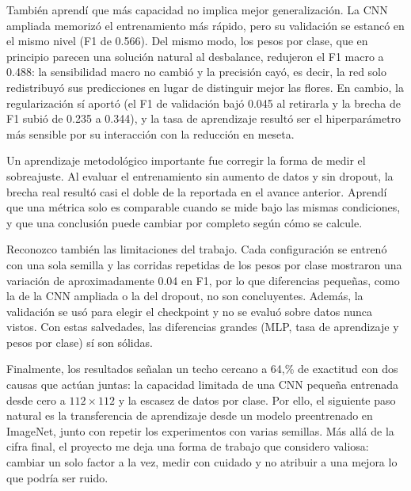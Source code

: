 También aprendí que más capacidad no implica mejor generalización. La CNN ampliada memorizó el entrenamiento más rápido, pero su validación se estancó en el mismo nivel (F1 de 0.566). Del mismo modo, los pesos por clase, que en principio parecen una solución natural al desbalance, redujeron el F1 macro a 0.488: la sensibilidad macro no cambió y la precisión cayó, es decir, la red solo redistribuyó sus predicciones en lugar de distinguir mejor las flores. En cambio, la regularización sí aportó (el F1 de validación bajó 0.045 al retirarla y la brecha de F1 subió de 0.235 a 0.344), y la tasa de aprendizaje resultó ser el hiperparámetro más sensible por su interacción con la reducción en meseta.

Un aprendizaje metodológico importante fue corregir la forma de medir el sobreajuste. Al evaluar el entrenamiento sin aumento de datos y sin dropout, la brecha real resultó casi el doble de la reportada en el avance anterior. Aprendí que una métrica solo es comparable cuando se mide bajo las mismas condiciones, y que una conclusión puede cambiar por completo según cómo se calcule.

Reconozco también las limitaciones del trabajo. Cada configuración se entrenó con una sola semilla y las corridas repetidas de los pesos por clase mostraron una variación de aproximadamente 0.04 en F1, por lo que diferencias pequeñas, como la de la CNN ampliada o la del dropout, no son concluyentes. Además, la validación se usó para elegir el checkpoint y no se evaluó sobre datos nunca vistos. Con estas salvedades, las diferencias grandes (MLP, tasa de aprendizaje y pesos por clase) sí son sólidas.

Finalmente, los resultados señalan un techo cercano a 64,\% de exactitud con dos causas que actúan juntas: la capacidad limitada de una CNN pequeña entrenada desde cero a $112 \times 112$ y la escasez de datos por clase. Por ello, el siguiente paso natural es la transferencia de aprendizaje desde un modelo preentrenado en ImageNet, junto con repetir los experimentos con varias semillas. Más allá de la cifra final, el proyecto me deja una forma de trabajo que considero valiosa: cambiar un solo factor a la vez, medir con cuidado y no atribuir a una mejora lo que podría ser ruido.
